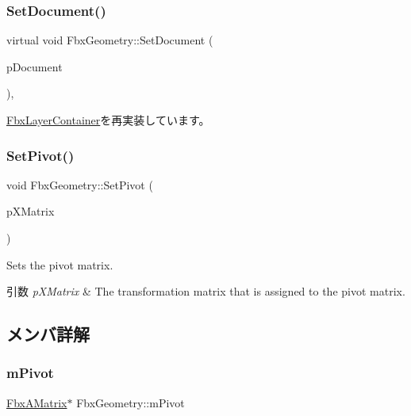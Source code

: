 \subsubsection{\texorpdfstring{Set\+Document()}{SetDocument()}}
{\footnotesize\ttfamily virtual void Fbx\+Geometry\+::\+Set\+Document (\begin{DoxyParamCaption}\item[{\hyperlink{class_fbx_document}{Fbx\+Document} $\ast$}]{p\+Document }\end{DoxyParamCaption})\hspace{0.3cm}{\ttfamily [protected]}, {\ttfamily [virtual]}}



\hyperlink{class_fbx_layer_container_a1743b1727b9f522d69bbf0d65c2a5073}{Fbx\+Layer\+Container}を再実装しています。

\mbox{\label{class_fbx_geometry_a0b6b14186134a64ad55a47bcac865d70}} 
\subsubsection{\texorpdfstring{Set\+Pivot()}{SetPivot()}}
{\footnotesize\ttfamily void Fbx\+Geometry\+::\+Set\+Pivot (\begin{DoxyParamCaption}\item[{\hyperlink{class_fbx_a_matrix}{Fbx\+A\+Matrix} \&}]{p\+X\+Matrix }\end{DoxyParamCaption})}

Sets the pivot matrix. 
\begin{DoxyParams}{引数}
{\em p\+X\+Matrix} & The transformation matrix that is assigned to the pivot matrix. \\
\hline
\end{DoxyParams}


\subsection{メンバ詳解}
\mbox{\label{class_fbx_geometry_ab9f5852d38a38a9efb0ab63bd74503c0}} 
\subsubsection{\texorpdfstring{m\+Pivot}{mPivot}}
{\footnotesize\ttfamily \hyperlink{class_fbx_a_matrix}{Fbx\+A\+Matrix}$\ast$ Fbx\+Geometry\+::m\+Pivot\hspace{0.3cm}{\ttfamily [protected]}}



